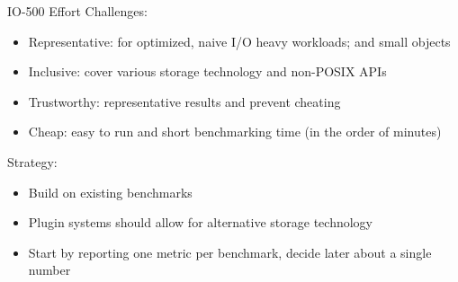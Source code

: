 \documentclass[portrait,a0paper,fontscale=0.4]{baposter}
\begin{document}
\begin{poster}
\begin{posterbox}[name=HHCC,column=1,span=2, below=schedule, above=bottom]{IO-500 Effort}
Challenges:
\vspace*{-1em}
\begin{itemize}
\item Representative: for optimized, naive I/O heavy workloads; and small objects
\item Inclusive: cover various storage technology and non-POSIX APIs
\item Trustworthy: representative results and prevent cheating
\item Cheap: easy to run and short benchmarking time (in the order of minutes)
\end{itemize}


Strategy:
\vspace*{-1em}
\begin{itemize}
\item Build on existing benchmarks
\item Plugin systems should allow for alternative storage technology
\item Start by reporting one metric per benchmark, decide later about a single number
\end{itemize}


\end{posterbox}







\end{poster}
\end{document}
